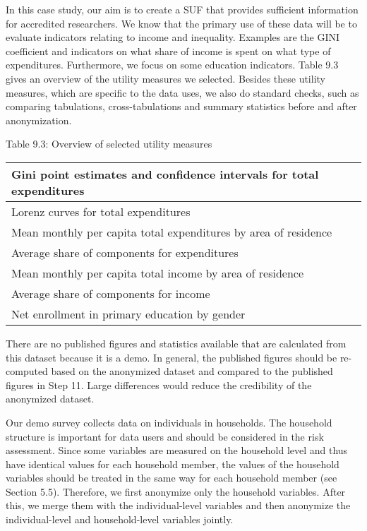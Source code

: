 \documentclass[letterpaper,10pt,english]{sphinxmanual}
\begin{document}
In this case study, our aim is to create a SUF that provides sufficient
information for accredited researchers. We know that the primary use of
these data will be to evaluate indicators relating to income and
inequality. Examples are the GINI coefficient and indicators on what
share of income is spent on what type of expenditures. Furthermore, we
focus on some education indicators. Table 9.3 gives an overview of the
utility measures we selected. Besides these utility measures, which are
specific to the data uses, we also do standard checks, such as comparing
tabulations, cross-tabulations and summary statistics before and after
anonymization.

Table 9.3: Overview of selected utility measures


\begin{savenotes}\sphinxattablestart
\centering
\begin{tabulary}{\linewidth}[t]{|T|}
\hline
\sphinxstyletheadfamily 
Gini point estimates and confidence intervals for total expenditures
\\
\hline
Lorenz curves for total expenditures
\\
\hline
Mean monthly per capita total expenditures by area of residence
\\
\hline
Average share of components for expenditures
\\
\hline
Mean monthly per capita total income by area of residence
\\
\hline
Average share of components for income
\\
\hline
Net enrollment in primary education by gender
\\
\hline
\end{tabulary}
\par
\sphinxattableend\end{savenotes}

There are no published figures and statistics available that are
calculated from this dataset because it is a demo. In general, the
published figures should be re-computed based on the anonymized dataset
and compared to the published figures in Step 11. Large differences
would reduce the credibility of the anonymized dataset.


Our demo survey collects data on individuals in households. The
household structure is important for data users and should be considered
in the risk assessment. Since some variables are measured on the
household level and thus have identical values for each household
member, the values of the household variables should be treated in the
same way for each household member (see Section 5.5). Therefore, we
first anonymize only the household variables. After this, we merge them
with the individual-level variables and then anonymize the
individual-level and household-level variables jointly.
\end{document}
